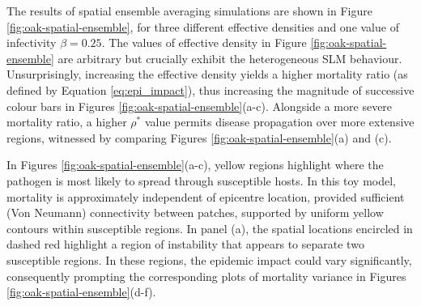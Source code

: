 The results of spatial ensemble averaging simulations are shown in Figure \ref{fig:oak-spatial-ensemble},
for three different effective densities and one value of infectivity $\beta=0.25$. 
The values of effective density in Figure \ref{fig:oak-spatial-ensemble} are arbitrary
but crucially exhibit the heterogeneous SLM behaviour. Unsurprisingly, increasing the effective density yields a 
higher mortality ratio (as defined by Equation \ref{eq:epi_impact}), thus increasing the magnitude of successive 
colour bars in Figures \ref{fig:oak-spatial-ensemble}(a-c). Alongside a more severe mortality ratio, a higher $\rho^*$
value permits disease propagation over more extensive regions, witnessed by comparing Figures \ref{fig:oak-spatial-ensemble}(a) and (c).

In Figures \ref{fig:oak-spatial-ensemble}(a-c), yellow regions highlight where the pathogen is most 
likely to spread through susceptible hosts. In this toy model, mortality is approximately independent of epicentre location, 
provided sufficient (Von Neumann) connectivity between patches, supported by uniform yellow contours within susceptible regions.
In panel (a), the spatial locations encircled in dashed red highlight a region of instability that appears to separate two susceptible regions.
In these regions, the epidemic impact could vary significantly, 
consequently prompting the corresponding plots of mortality variance in Figures \ref{fig:oak-spatial-ensemble}(d-f).

